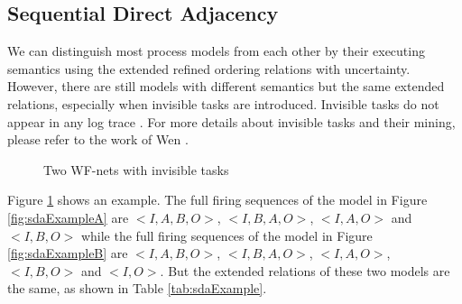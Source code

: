 \documentclass{llncs}
\begin{document}
\subsection{Sequential Direct Adjacency}\label{subsec:sda}
We can distinguish most process models from each other by their executing semantics using the extended refined ordering relations with uncertainty. However, there are still models with different semantics but the same extended relations, especially when invisible tasks are introduced. Invisible tasks do not appear in any log trace \cite{de2003workflow} . For more details about invisible tasks and their mining, please refer to the work of Wen \cite{wen2010mining}. 

\begin{figure}[ht]
\centering
{}
\hspace{0.5cm}
\caption{Two WF-nets with invisible tasks\label{fig:sdaExample}}
\end{figure}

\begin{example}\label{ex:sda}
Figure \ref{fig:sdaExample} shows an example. The full firing sequences of the model in Figure \ref{fig:sdaExampleA} are $<I,A,B,O>$, $<I,B,A,O>$, $<I,A,O>$ and $<I,B,O>$ while the full firing sequences of the model in Figure \ref{fig:sdaExampleB} are $<I,A,B,O>$, $<I,B,A,O>$, $<I,A,O>$, $<I,B,O>$ and $<I,O>$. But the extended relations of these two models are the same, as shown in Table \ref{tab:sdaExample}.
\end{example}
\end{document}
